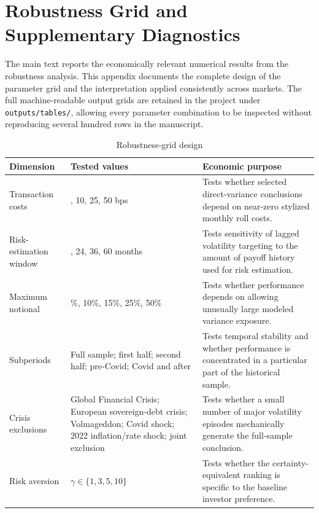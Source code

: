 \section{Robustness Grid and Supplementary Diagnostics}
\label{app:robustness}

The main text reports the economically relevant numerical results from the robustness analysis. This appendix documents the complete design of the parameter grid and the interpretation applied consistently across markets. The full machine-readable output grids are retained in the project under \texttt{outputs/tables/}, allowing every parameter combination to be inspected without reproducing several hundred rows in the manuscript.

\begin{table}[H]
\centering
\caption{Robustness-grid design}
\label{tab:appendix_robustness_grid}
\small
\begin{tabularx}{\textwidth}{
>{\raggedright\arraybackslash}p{2.7cm}
>{\raggedright\arraybackslash}p{3.6cm}
>{\raggedright\arraybackslash}X
}
\toprule
Dimension & Tested values & Economic purpose \\
\midrule
Transaction costs
& 0, 10, 25, 50 bps
& Tests whether selected direct-variance conclusions depend on near-zero stylized monthly roll costs. \\

Risk-estimation window
& 12, 24, 36, 60 months
& Tests sensitivity of lagged volatility targeting to the amount of payoff history used for risk estimation. \\

Maximum notional
& 5\%, 10\%, 15\%, 25\%, 50\%
& Tests whether performance depends on allowing unusually large modeled variance exposure. \\

Subperiods
& Full sample; first half; second half; pre-Covid; Covid and after
& Tests temporal stability and whether performance is concentrated in a particular part of the historical sample. \\

Crisis exclusions
& Global Financial Crisis; European sovereign-debt crisis; Volmageddon; Covid shock; 2022 inflation/rate shock; joint exclusion
& Tests whether a small number of major volatility episodes mechanically generate the full-sample conclusion. \\

Risk aversion
& $\gamma \in \{1,3,5,10\}$
& Tests whether the certainty-equivalent ranking is specific to the baseline investor preference. \\
\bottomrule
\end{tabularx}
\end{table}


